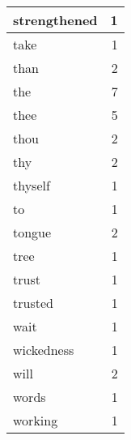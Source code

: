 \begin{center}
\begin{longtable}{l|r}
strengthened & 1 \\ \hline
take & 1 \\ \hline
than & 2 \\ \hline
the & 7 \\ \hline
thee & 5 \\ \hline
thou & 2 \\ \hline
thy & 2 \\ \hline
thyself & 1 \\ \hline
to & 1 \\ \hline
tongue & 2 \\ \hline
tree & 1 \\ \hline
trust & 1 \\ \hline
trusted & 1 \\ \hline
wait & 1 \\ \hline
wickedness & 1 \\ \hline
will & 2 \\ \hline
words & 1 \\ \hline
working & 1 \\ \hline
\end{longtable}
\end{center}



\normalsize



